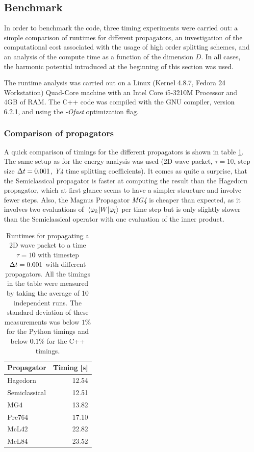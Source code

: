\subsection{Benchmark}
\label{subsec:benchmark}
%
In order to benchmark the code, three timing experiments were carried out: a simple comparison of runtimes for different propagators, an investigation of the computational cost associated with the usage of high order splitting schemes, and an analysis of the compute time as a function of the dimension $D$.
In all cases, the harmonic potential introduced at the beginning of this section was used.
\par\medskip
%
The runtime analysis was carried out on a Linux (Kernel 4.8.7, Fedora 24 Workstation) Quad-Core machine with an Intel Core i5-3210M Processor and
4GB of RAM. The C++ code was compiled with the GNU compiler, version 6.2.1, and using the \emph{-Ofast} optimization flag.




\subsubsection{Comparison of propagators}
%
A quick comparison of timings for the different propagators is shown in table \ref{tab:speedup}.
The same setup as for the energy analysis was used (2D wave packet, $\tau = 10$, step size $\Delta t = 0.001$, \emph{Y4} time splitting coefficients).
It comes as quite a surprise, that the Semiclassical propagator is faster at computing the result than the Hagedorn propagator, which at first glance seems to have  a simpler structure and involve fewer steps.
Also, the Magnus Propagator \emph{MG4} is cheaper than expected, as it involves two evaluations of $\matrixel{\varphi_k}{W}{\varphi_l}$ per time step but is only slightly slower than the Semiclassical operator with one evaluation of the inner product.
%
\begin{table}[h]
	\centering
	\begin{tabular}{|l | r |} 
		\hline
		\multicolumn{1}{|c}{\textbf{Propagator}} &
		\multicolumn{1}{|c|}{\textbf{Timing [s]}} \\
		\hline
		Hagedorn & 12.54 \\
		Semiclassical & 12.51 \\
		MG4 & 13.82 \\
		Pre764 & 17.10 \\
		McL42 & 22.82 \\
		McL84 & 23.52 \\
		\hline
	\end{tabular}
	\caption{Runtimes for propagating a 2D wave packet to a time $\tau = 10$ with timestep $\Delta t = 0.001$ with different propagators. All the timings in the table were measured by taking the average of 10 independent runs. The standard deviation of these measurements was below $1\%$ for the Python timings and below $0.1\%$ for the C++ timings.}
	\label{tab:speedup}
\end{table}


